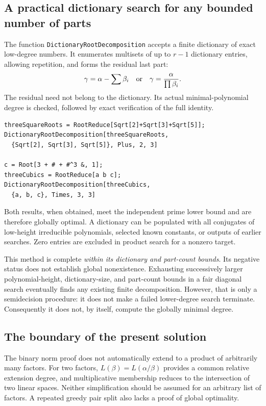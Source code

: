 \documentclass[11pt,a4paper]{article}
\theoremstyle{definition}\newtheorem{definition}[theorem]{Definition}
\theoremstyle{remark}\newtheorem{remark}[theorem]{Remark}
\newcommand{\code}[1]{\texttt{#1}}
\begin{document}
\subsection{A practical dictionary search for any bounded number of parts}
The function \code{DictionaryRootDecomposition} accepts a finite dictionary of exact low-degree numbers. It enumerates multisets of up to $r-1$ dictionary entries, allowing repetition, and forms the residual last part:
\[
\gamma=\alpha-\sum\beta_i\quad\hbox{or}\quad
\gamma=\frac{\alpha}{\prod\beta_i}.
\]
The residual need not belong to the dictionary. Its actual minimal-polynomial degree is checked, followed by exact verification of the full identity.
\begin{lstlisting}
threeSquareRoots = RootReduce[Sqrt[2]+Sqrt[3]+Sqrt[5]];
DictionaryRootDecomposition[threeSquareRoots,
  {Sqrt[2], Sqrt[3], Sqrt[5]}, Plus, 2, 3]

c = Root[3 + # + #^3 &, 1];
threeCubics = RootReduce[a b c];
DictionaryRootDecomposition[threeCubics,
  {a, b, c}, Times, 3, 3]
\end{lstlisting}
Both results, when obtained, meet the independent prime lower bound and are therefore globally optimal. A dictionary can be populated with all conjugates of low-height irreducible polynomials, selected known constants, or outputs of earlier searches. Zero entries are excluded in product search for a nonzero target.

This method is complete \emph{within its dictionary and part-count bounds}. Its negative status does not establish global nonexistence. Exhausting successively larger polynomial-height, dictionary-size, and part-count bounds in a fair diagonal search eventually finds any existing finite decomposition. However, that is only a semidecision procedure: it does not make a failed lower-degree search terminate. Consequently it does not, by itself, compute the globally minimal degree.

\subsection{The boundary of the present solution}
The binary norm proof does not automatically extend to a product of arbitrarily many factors. For two factors, $L(\beta)=L(\alpha/\beta)$ provides a common relative extension degree, and multiplicative membership reduces to the intersection of two linear spaces. Neither simplification should be assumed for an arbitrary list of factors. A repeated greedy pair split also lacks a proof of global optimality.
\end{document}
